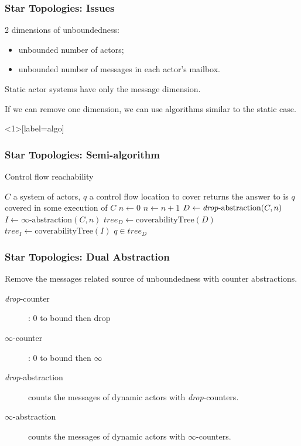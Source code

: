 \documentclass{beamer}
\theoremstyle{remark}
\theoremstyle{definition}
\newcommand{\dabs}{\emph{drop}-abstraction}
\newcommand{\iabs}{$\infty$-abstraction}
\begin{document}
\begin{frame}
\frametitle{Star Topologies: Issues}
2 dimensions of unboundedness:
\begin{itemize}
\item unbounded number of actors;
\item unbounded number of messages in each actor's mailbox.
\end{itemize}

\vspace{20pt}

Static actor systems have only the message dimension.

\vspace{20pt}

If we can remove one dimension, we can use algorithms similar to the static case.
\end{frame}

\begin{frame}<1>[label=algo]
\frametitle{Star Topologies: Semi-algorithm}
\begin{algorithm}[H]
{\small
\caption{Control flow reachability}
\label{algCtrFlowReach}
\begin{algorithmic}
\REQUIRE $C$ a system of actors, $q$ a control flow location to cover %
\ENSURE returns the answer to is $q$ covered in some execution of $C$ %
\STATE $n \leftarrow 0$
\REPEAT
\STATE $n \leftarrow n+1$
\STATE $D \leftarrow \text{\dabs{}}(C,n)$
\STATE $I \leftarrow \text{\iabs{}}(C,n)$
\STATE $tree_D \leftarrow \text{coverabilityTree}(D)$
\STATE $tree_I \leftarrow \text{coverabilityTree}(I)$
\RETURN $q \in tree_D$
\end{algorithmic}
}
\end{algorithm}
\end{frame}

\begin{frame}
\frametitle{Star Topologies: Dual Abstraction}
Remove the messages related source of unboundedness with \alert{counter abstractions}.

\vspace{10pt}

\begin{description}
\item[\emph{drop}-counter]: 0 to bound then drop
\item[$\infty$-counter]: 0 to bound then $\infty$
\end{description}

\vspace{15pt}

\begin{description}
\item[\dabs{}] counts the messages of dynamic actors with \emph{drop}-counters.
\item[\iabs{}] counts the messages of dynamic actors with $\infty$-counters.
\end{description}
\end{frame}
\end{document}
